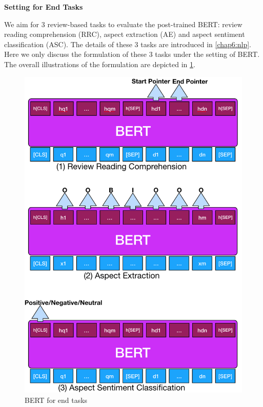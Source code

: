 \textbf{Setting for End Tasks}

We aim for 3 review-based tasks to evaluate the post-trained BERT: review reading comprehension (RRC), aspect extraction (AE) and aspect sentiment classification (ASC).
The details of these 3 tasks are introduced in \ref{chap6:nlp}.
Here we only discuss the formulation of these 3 tasks under the setting of BERT.
The overall illustrations of the formulation are depicted in \ref{chap6:fig:overview}.

\begin{figure}
\centering
\includegraphics[width=5.in]{fig/naacl19_overview.png}
    \caption{BERT for end tasks}
\label{chap6:fig:overview}
\vspace{-3mm}
\end{figure}

